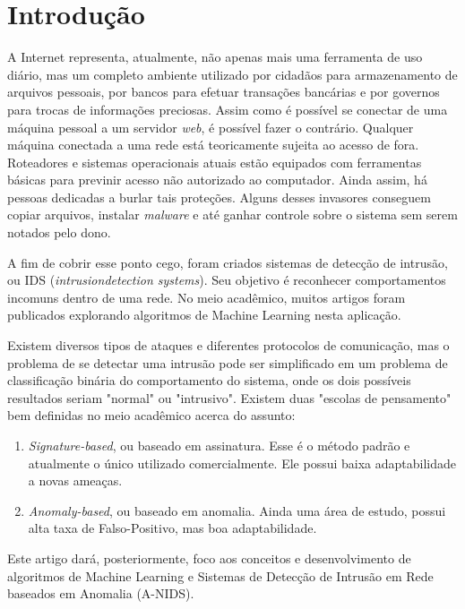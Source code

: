 \chapter{Introdução}
\label{ch:introducao}

A Internet representa, atualmente, não apenas mais uma ferramenta de uso diário, mas um completo ambiente utilizado por
cidadãos para armazenamento de arquivos pessoais, por bancos para efetuar transações bancárias e por governos para
trocas de informações preciosas.
Assim como é possível se conectar de uma máquina pessoal a um servidor \textit{web}, é possível fazer o contrário.
Qualquer máquina conectada a uma rede está teoricamente sujeita ao acesso de fora.
Roteadores e sistemas operacionais atuais estão equipados com ferramentas básicas para previnir acesso não autorizado
ao computador. Ainda assim, há pessoas dedicadas a burlar tais proteções. Alguns desses invasores conseguem copiar
arquivos, instalar \textit{malware} e até ganhar controle sobre o sistema sem serem notados pelo dono.
\par A fim de cobrir esse ponto cego, foram criados sistemas de detecção de intrusão, ou IDS
(\textit{intrusiondetection systems}). Seu objetivo é reconhecer comportamentos incomuns dentro de uma rede.
No meio acadêmico, muitos artigos foram publicados explorando algoritmos de Machine Learning nesta aplicação.
\par Existem diversos tipos de ataques e diferentes protocolos de comunicação, mas o problema de se detectar uma
intrusão pode ser simplificado em um problema de classificação binária do comportamento do sistema, onde os dois
possíveis resultados seriam "normal" ou "intrusivo". Existem duas "escolas de pensamento" bem definidas no meio
acadêmico acerca do assunto:
\begin{enumerate}
    \item \textit{Signature-based}, ou baseado em assinatura. Esse é o método padrão e atualmente o único utilizado
    comercialmente. Ele possui baixa adaptabilidade a novas ameaças.
    \item \textit{Anomaly-based}, ou baseado em anomalia. Ainda uma área de estudo, possui alta taxa de
    Falso-Positivo, mas boa adaptabilidade.
\end{enumerate}
Este artigo dará, posteriormente, foco aos conceitos e desenvolvimento de algoritmos de Machine Learning e Sistemas de
Detecção de Intrusão em Rede baseados em Anomalia (A-NIDS).
